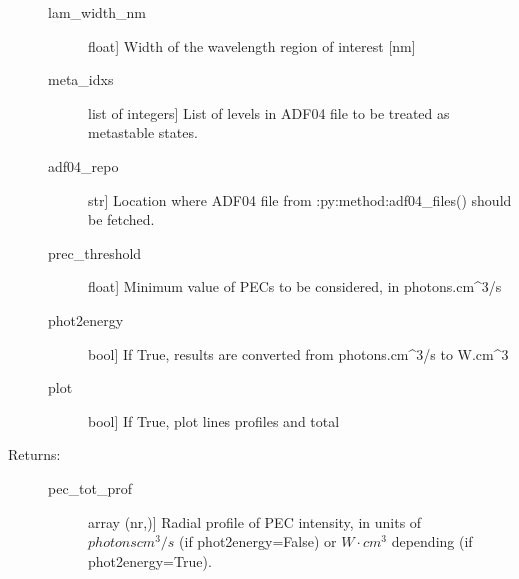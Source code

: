 \documentclass[letterpaper,10pt,english]{sphinxmanual}
\begin{document}
\begin{fulllineitems}
\begin{description}
\begin{description}
\item[{lam\_width\_nm}] \leavevmode{[}float{]}
Width of the wavelength region of interest {[}nm{]}

\item[{meta\_idxs}] \leavevmode{[}list of integers{]}
List of levels in ADF04 file to be treated as metastable states.

\item[{adf04\_repo}] \leavevmode{[}str{]}
Location where ADF04 file from :py:method:adf04\_files() should be fetched.

\item[{prec\_threshold}] \leavevmode{[}float{]}
Minimum value of PECs to be considered, in photons.cm\textasciicircum{}3/s

\item[{phot2energy}] \leavevmode{[}bool{]}
If True, results are converted from photons.cm\textasciicircum{}3/s to W.cm\textasciicircum{}3

\item[{plot}] \leavevmode{[}bool{]}
If True, plot lines profiles and total

\end{description}

\item[{Returns:}] \leavevmode\begin{description}
\item[{pec\_tot\_prof}] \leavevmode{[}array (nr,){]}
Radial profile of PEC intensity, in units of \(photons cm^3/s\) (if phot2energy=False) or 
\(W \cdot cm^3\) depending (if phot2energy=True).

\end{description}

\end{description}

\end{fulllineitems}

\end{document}
